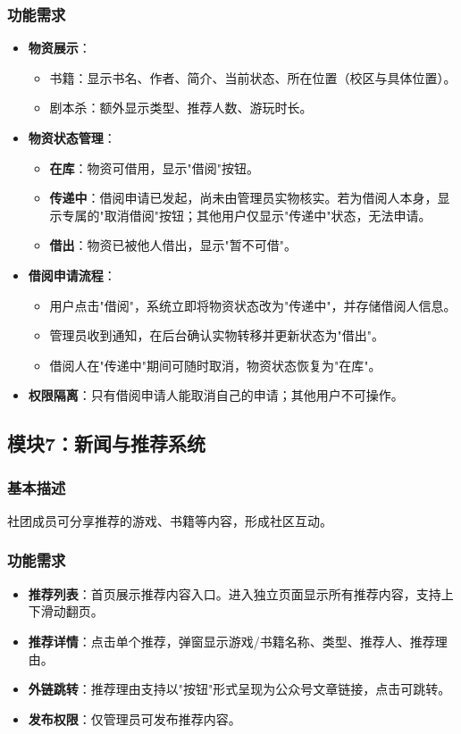 \documentclass[a4paper,12pt]{article}
\begin{document}
\subsubsection{功能需求}
\begin{itemize}
    \item \textbf{物资展示}：
        \begin{itemize}
            \item 书籍：显示书名、作者、简介、当前状态、所在位置（校区与具体位置）。
            \item 剧本杀：额外显示类型、推荐人数、游玩时长。
        \end{itemize}
    \item \textbf{物资状态管理}：
        \begin{itemize}
            \item \textbf{在库}：物资可借用，显示"借阅"按钮。
            \item \textbf{传递中}：借阅申请已发起，尚未由管理员实物核实。若为借阅人本身，显示专属的"取消借阅"按钮；其他用户仅显示"传递中"状态，无法申请。
            \item \textbf{借出}：物资已被他人借出，显示"暂不可借"。
        \end{itemize}
    \item \textbf{借阅申请流程}：
        \begin{itemize}
            \item 用户点击"借阅"，系统立即将物资状态改为"传递中"，并存储借阅人信息。
            \item 管理员收到通知，在后台确认实物转移并更新状态为"借出"。
            \item 借阅人在"传递中"期间可随时取消，物资状态恢复为"在库"。
        \end{itemize}
    \item \textbf{权限隔离}：只有借阅申请人能取消自己的申请；其他用户不可操作。
\end{itemize}

\subsection{模块7：新闻与推荐系统}
\subsubsection{基本描述}
社团成员可分享推荐的游戏、书籍等内容，形成社区互动。

\subsubsection{功能需求}
\begin{itemize}
    \item \textbf{推荐列表}：首页展示推荐内容入口。进入独立页面显示所有推荐内容，支持上下滑动翻页。
    \item \textbf{推荐详情}：点击单个推荐，弹窗显示游戏/书籍名称、类型、推荐人、推荐理由。
    \item \textbf{外链跳转}：推荐理由支持以"按钮"形式呈现为公众号文章链接，点击可跳转。
    \item \textbf{发布权限}：仅管理员可发布推荐内容。
\end{itemize}
\end{document}
